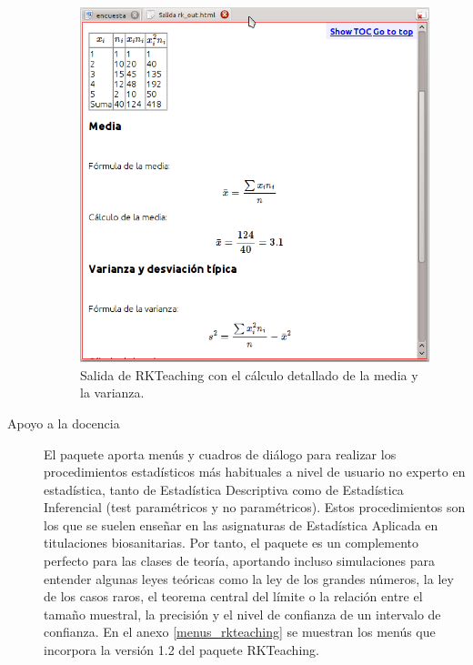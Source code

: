 \documentclass[10pt,twoside,spanish]{article}
\numberwithin{equation}{section}
\begin{document}
\begin{description}
\begin{figure}[htp]
\begin{center}
  \includegraphics[width=\textwidth]{img/calculo_detallado.png}
  \caption{Salida de RKTeaching con el cálculo detallado de la media y la varianza.}
  \label{g:calculo_detallado}
\end{center}
\end{figure}

\item[Apoyo a la docencia] El paquete aporta menús y cuadros de diálogo para realizar los
procedimientos estadísticos más habituales a nivel de usuario no experto en estadística, tanto de Estadística Descriptiva como de
Estadística Inferencial (test paramétricos y no paramétricos).
Estos procedimientos son los que se suelen enseñar en las asignaturas de Estadística Aplicada en titulaciones biosanitarias.
Por tanto, el paquete es un complemento perfecto para las clases de teoría, aportando incluso simulaciones para entender algunas leyes
teóricas como la ley de los grandes números, la ley de los casos raros, el teorema central del límite o la relación entre el tamaño
muestral, la precisión y el nivel de confianza de un intervalo de confianza.
En el anexo \ref{menus_rkteaching} se muestran los menús que incorpora la versión 1.2 del paquete RKTeaching.
\end{description}
\end{document}
